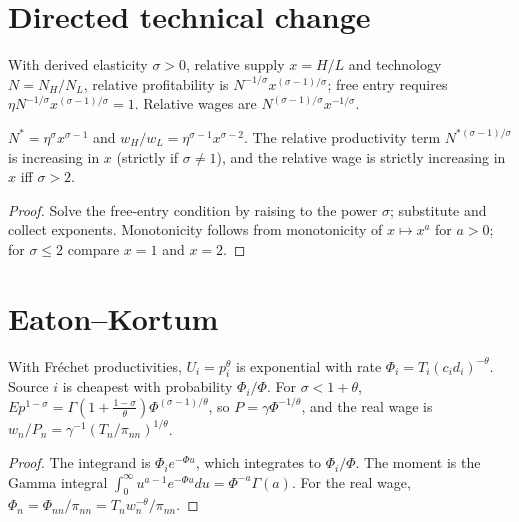 \section{Directed technical change}

\begin{definition}
\label{def:directed_tech}
\leanok
With derived elasticity $\sigma>0$, relative supply $x=H/L$ and technology $N=N_H/N_L$, relative profitability is
$N^{-1/\sigma}x^{(\sigma-1)/\sigma}$; free entry requires $\eta N^{-1/\sigma}x^{(\sigma-1)/\sigma}=1$. Relative wages are
$N^{(\sigma-1)/\sigma}x^{-1/\sigma}$.
\end{definition}

\begin{theorem}
\label{thm:directed_tech}
\leanok
{}
$N^*=\eta^\sigma x^{\sigma-1}$ and $w_H/w_L=\eta^{\sigma-1}x^{\sigma-2}$. The relative productivity term $N^{*(\sigma-1)/\sigma}$ is
increasing in $x$ (strictly if $\sigma\ne1$), and the relative wage is strictly increasing in $x$ iff $\sigma>2$.
\end{theorem}
\begin{proof}
\leanok
Solve the free-entry condition by raising to the power $\sigma$; substitute and collect exponents. Monotonicity follows from
monotonicity of $x\mapsto x^a$ for $a>0$; for $\sigma\le2$ compare $x=1$ and $x=2$.
\end{proof}

\section{Eaton--Kortum}

\begin{theorem}
\label{thm:eaton_kortum}
\leanok
With Fr\'echet productivities, $U_i=p_i^\theta$ is exponential with rate $\Phi_i=T_i(c_id_i)^{-\theta}$. Source $i$ is cheapest with
probability $\Phi_i/\Phi$. For $\sigma<1+\theta$, $E p^{1-\sigma}=\Gamma(1+\frac{1-\sigma}\theta)\Phi^{(\sigma-1)/\theta}$, so
$P=\gamma\Phi^{-1/\theta}$, and the real wage is $w_n/P_n=\gamma^{-1}(T_n/\pi_{nn})^{1/\theta}$.
\end{theorem}
\begin{proof}
\leanok
The integrand is $\Phi_ie^{-\Phi u}$, which integrates to $\Phi_i/\Phi$. The moment is the Gamma integral
$\int_0^\infty u^{a-1}e^{-\Phi u}du=\Phi^{-a}\Gamma(a)$. For the real wage, $\Phi_n=\Phi_{nn}/\pi_{nn}=T_nw_n^{-\theta}/\pi_{nn}$.
\end{proof}

